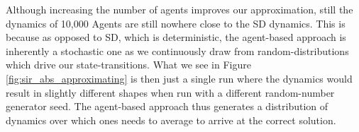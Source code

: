 Although increasing the number of agents improves our approximation, still the dynamics of 10,000 Agents are still nowhere close to the SD dynamics. This is because as opposed to SD, which is deterministic, the agent-based approach is inherently a stochastic one as we continuously draw from random-distributions which drive our state-transitions. What we see in Figure \ref{fig:sir_abs_approximating} is then just a single run where the dynamics would result in slightly different shapes when run with a different random-number generator seed. The agent-based approach thus generates a distribution of dynamics over which ones needs to average to arrive at the correct solution. 